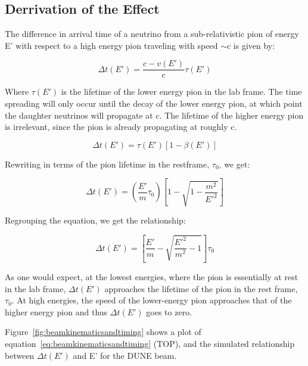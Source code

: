 \subsection{Derrivation of the Effect}

The difference in arrival time of a neutrino from a sub-relativistic
pion of energy E' with respect to a high energy pion traveling with
speed $\sim$c is given by:

\begin{equation}
\Delta t(E') = \frac{c - v(E')}{c} \tau (E')
\end{equation}

Where $\tau (E')$ is the lifetime of the lower energy pion in the lab
frame. The time spreading will only occur until the decay of the lower
energy pion, at which point the daughter neutrinos will propagate at
c. The lifetime of the higher energy pion is irrelevant, since the
pion is already propagating at roughly c.

\begin{equation}
\Delta t(E') = \tau (E') [1 - \beta (E')]
\end{equation}

Rewriting in terms of the pion lifetime in the restframe, $\tau_0$, we get:

\begin{equation}
\Delta t(E') = \left(\frac{E'}{m} \tau_0\right) \left[1 - \sqrt{ 1 - \frac{m^2}{E'^2}} \right] 
\end{equation}

Regrouping the equation, we get the relationship:

\begin{equation}
\Delta t(E') = \left[\frac{E'}{m} - \sqrt{ \frac{E'^2}{m^2} - 1}\right] \tau_0
\label{eq:beamkinematicsandtiming}
\end{equation}

As one would expect, at the lowest energies, where the pion is
essentially at rest in the lab frame, $\Delta t(E')$ approaches the
lifetime of the pion in the rest frame, $\tau_0$. At high energies,
the speed of the lower-energy pion approaches that of the higher
energy pion and thus $\Delta t(E')$ goes to zero.

Figure~\ref{fig:beamkinematicsandtiming} shows a plot of
equation~\ref{eq:beamkinematicsandtiming} (TOP), and the simulated
relationship between $\Delta t(E')$ and E' for the DUNE beam.

